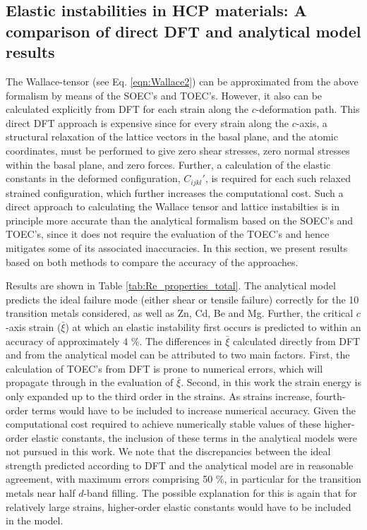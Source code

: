 \documentclass[showpacs,aps,floatfix,prb,reprint,superscriptaddress]{revtex4-1}
\begin{document}
\subsection{Elastic instabilities in HCP materials: A comparison of direct DFT and analytical model results}
The Wallace-tensor (see Eq. \ref{eqn:Wallace2}) can be approximated from the above formalism by means of the SOEC's and TOEC's. However, it also can be calculated explicitly from DFT for each strain along the $c$-deformation path. This direct DFT approach is expensive since for every strain along the $c$-axis, a structural relaxation of the lattice vectors in the basal plane, and the atomic coordinates, must be performed to give zero shear stresses, zero normal stresses within the basal plane, and zero forces. Further, a calculation of the elastic constants in the deformed configuration, $C_{ijkl}'$, is required for each such relaxed strained configuration, which further increases the computational cost.  Such a direct approach to calculating the Wallace tensor and lattice instabilties is in principle more accurate than the analytical formalism based on the SOEC's and TOEC's, since it does not require the evaluation of the TOEC's and hence mitigates some of its associated inaccuracies. In this section, we present results based on both methods to compare the accuracy of the approaches.

Results are shown in Table \ref{tab:Re_properties_total}. The analytical model predicts the ideal failure mode (either shear or tensile failure) correctly for the 10 transition metals considered, as well as Zn, Cd, Be and Mg.  Further, the critical $c$-axis strain ($\bar{\xi}$) at which an elastic instability first occurs is predicted to within an accuracy of approximately 4 \%. The differences in $\bar{\xi}$ calculated directly from DFT and from the analytical model can be attributed to two main factors. First, the calculation of TOEC's from DFT is prone to numerical errors, which will propagate through in the evaluation of $\bar{\xi}$. Second, in this work the strain energy is only expanded up to the third order in the strains. As strains increase, fourth-order terms would have to be included to increase numerical accuracy. Given the computational cost required to achieve numerically stable values of these higher-order elastic constants, the inclusion of these terms in the analytical models were not pursued in this work. We note that the discrepancies between the ideal strength predicted according to DFT and the analytical model are in reasonable agreement, with maximum errors comprising 50 \%, in particular for the transition metals near half $d$-band filling. The possible explanation for this is again that for relatively large strains, higher-order elastic constants would have to be included in the model.
\end{document}
